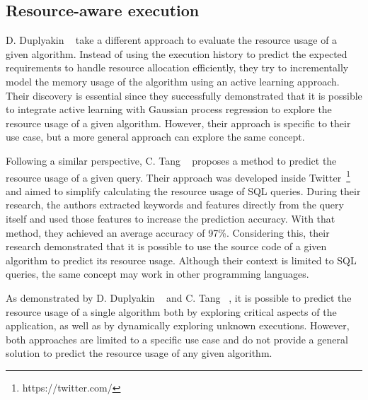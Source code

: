 \subsection{Resource-aware execution}
\label{subsec:resource-aware-execution}

D. Duplyakin \etal~\cite{duplyakin2018} take a different approach to evaluate the resource usage of a given algorithm.
Instead of using the execution history to predict the expected requirements to handle resource allocation efficiently, they try to incrementally model the memory usage of the algorithm using an active learning approach.
Their discovery is essential since they successfully demonstrated that it is possible to integrate active learning with Gaussian process regression to explore the resource usage of a given algorithm.
However, their approach is specific to their use case, but a more general approach can explore the same concept.

Following a similar perspective, C. Tang \etal~\cite{tang2021} proposes a method to predict the resource usage of a given query.
Their approach was developed inside Twitter~\footnote{https://twitter.com/} and aimed to simplify calculating the resource usage of SQL queries.
During their research, the authors extracted keywords and features directly from the query itself and used those features to increase the prediction accuracy.
With that method, they achieved an average accuracy of 97\%.
Considering this, their research demonstrated that it is possible to use the source code of a given algorithm to predict its resource usage.
Although their context is limited to SQL queries, the same concept may work in other programming languages.

As demonstrated by D. Duplyakin \etal~\cite{duplyakin2018} and C. Tang \etal~\cite{tang2021}, it is possible to predict the resource usage of a single algorithm both by exploring critical aspects of the application, as well as by dynamically exploring unknown executions.
However, both approaches are limited to a specific use case and do not provide a general solution to predict the resource usage of any given algorithm.
